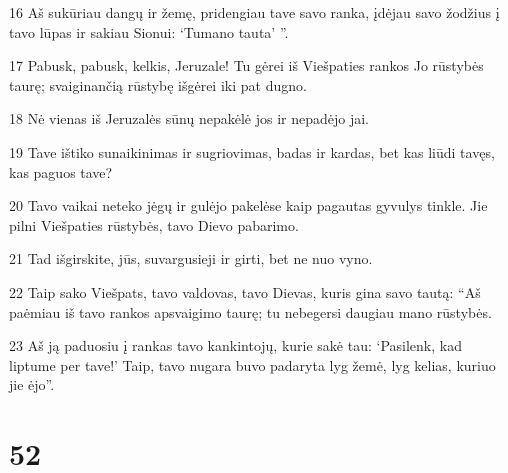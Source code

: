 \par 16 Aš sukūriau dangų ir žemę, pridengiau tave savo ranka, įdėjau savo žodžius į tavo lūpas ir sakiau Sionui: ‘Tu­mano tauta’ ”. 
\par 17 Pabusk, pabusk, kelkis, Jeruzale! Tu gėrei iš Viešpaties rankos Jo rūstybės taurę; svaiginančią rūstybę išgėrei iki pat dugno. 
\par 18 Nė vienas iš Jeruzalės sūnų nepakėlė jos ir nepadėjo jai. 
\par 19 Tave ištiko sunaikinimas ir sugriovimas, badas ir kardas, bet kas liūdi tavęs, kas paguos tave? 
\par 20 Tavo vaikai neteko jėgų ir gulėjo pakelėse kaip pagautas gyvulys tinkle. Jie pilni Viešpaties rūstybės, tavo Dievo pabarimo. 
\par 21 Tad išgirskite, jūs, suvargusieji ir girti, bet ne nuo vyno. 
\par 22 Taip sako Viešpats, tavo valdovas, tavo Dievas, kuris gina savo tautą: “Aš paėmiau iš tavo rankos apsvaigimo taurę; tu nebegersi daugiau mano rūstybės. 
\par 23 Aš ją paduosiu į rankas tavo kankintojų, kurie sakė tau: ‘Pasilenk, kad liptume per tave!’ Taip, tavo nugara buvo padaryta lyg žemė, lyg kelias, kuriuo jie ėjo”.



\chapter{52}


